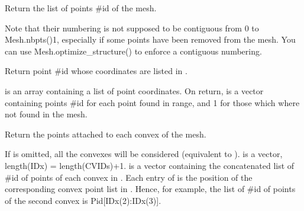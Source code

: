 \documentclass[a4paper,11pt,english]{sphinxmanual}
\begin{document}
\begin{fulllineitems}
\begin{fulllineitems}
\end{fulllineitems}


\begin{fulllineitems}
\label{\detokenize{python/cmdref_Mesh:getfem.Mesh.pid}}
Return the list of points \#id of the mesh.

Note that their numbering is not supposed to be contiguous from
0 to Mesh.nbpts()\sphinxhyphen{}1,
especially if some points have been removed from the mesh. You
can use Mesh.optimize\_structure() to enforce a contiguous
numbering.

\end{fulllineitems}


\begin{fulllineitems}
\label{\detokenize{python/cmdref_Mesh:getfem.Mesh.pid_from_coords}}
Return point \#id whose coordinates are listed in .

 is an array containing a list of point coordinates. On
return,  is a vector containing points
\#id for each point found in  range, and \sphinxhyphen{}1 for those
which where not found in the mesh.

\end{fulllineitems}


\begin{fulllineitems}
\label{\detokenize{python/cmdref_Mesh:getfem.Mesh.pid_from_cvid}}
Return the points attached to each convex of the mesh.

If  is omitted, all the convexes will be considered
(equivalent to ).  is a
vector, length(IDx) = length(CVIDs)+1.  is a
vector containing the concatenated list of \#id of
points of each convex in . Each entry of  is the
position of the corresponding convex point list in . Hence,
for example, the list of \#id of points of the second convex is
Pid{[}IDx(2):IDx(3){]}.


\end{fulllineitems}
\end{fulllineitems}
\end{document}
